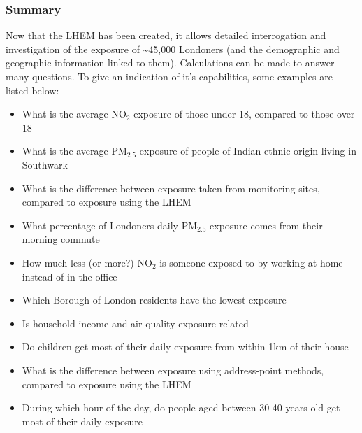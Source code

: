 
        \subsubsection{Summary}
        \label{subsubsec:methods_summary}

Now that the LHEM has been created, it allows detailed interrogation and investigation of the exposure of \textasciitilde45,000 Londoners (and the demographic and geographic information linked to them). Calculations can be made to answer many questions. To give an indication of it's capabilities, some examples are listed below:

\begin{itemize}
\item What is the average NO$_{2}$ exposure of those under 18, compared to those over 18
\item What is the average PM$_{2.5}$ exposure of people of Indian ethnic origin living in Southwark
\item What is the difference between exposure taken from monitoring sites, compared to exposure using the LHEM
\item What percentage of Londoners daily PM$_{2.5}$ exposure comes from their morning commute
\item How much less (or more?) NO$_{2}$ is someone exposed to by working at home instead of in the office
\item Which Borough of London residents have the lowest exposure
\item Is household income and air quality exposure related
\item Do children get most of their daily exposure from within 1km of their house
\item What is the difference between exposure using address-point methods, compared to exposure using the LHEM
\item During which hour of the day, do people aged between 30-40 years old get most of their daily exposure
\end{itemize}

